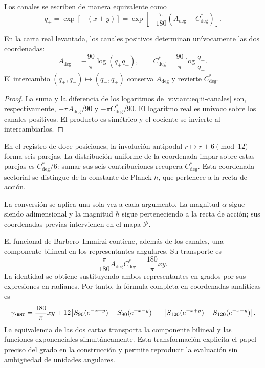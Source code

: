 Los canales se escriben de manera equivalente como
\begin{equation}
 q_\pm=\exp[-(x\pm y)]
 =\exp\!\left[-\frac{\pi}{180}(A_{\deg}\pm C^*_{\deg})\right].
\label{v:v:ant:eq:ii-canales}
\end{equation}
\begin{proposition}
\label{v:v:ant:prop:ii-inversion-canales-angulares}
En la carta real levantada, los canales positivos determinan
unívocamente las dos coordenadas:
\[
 A_{\deg}=-\frac{90}{\pi}\log(q_+q_-),\qquad
 C^*_{\deg}=\frac{90}{\pi}\log\frac{q_-}{q_+}.
\]
El intercambio \((q_+,q_-)\mapsto(q_-,q_+)\) conserva
\(A_{\deg}\) y revierte \(C^*_{\deg}\).
\end{proposition}
\begin{proof}
La suma y la diferencia de los logaritmos de
\eqref{v:v:ant:eq:ii-canales} son, respectivamente,
\(-\pi A_{\deg}/90\) y \(-\pi C^*_{\deg}/90\).
El logaritmo real es unívoco sobre los canales positivos.
El producto es simétrico y el cociente se invierte al intercambiarlos.
\end{proof}
En el registro de doce posiciones, la involución antipodal
\(r\mapsto r+6\pmod {12}\) forma seis parejas. La distribución
uniforme de la coordenada impar sobre estas parejas es
\(C^*_{\deg}/6\): sumar sus seis contribuciones recupera
\(C^*_{\deg}\). Esta coordenada sectorial se distingue de
la constante de Planck \(h\), que pertenece a la recta de acción.

La conversión se aplica una sola vez a cada argumento. La magnitud
\(\alpha\) sigue siendo adimensional y la magnitud \(\hbar\)
sigue perteneciendo a la recta de acción; sus coordenadas previas
intervienen en el mapa \(\mathcal P\).

El funcional de Barbero--Immirzi contiene, además de los canales, una
componente bilineal en los representantes angulares. Su transporte es
\begin{equation}
 \frac{\pi}{180}A_{\deg}C^*_{\deg}
 =\frac{180}{\pi}xy.
 \label{v:v:ant:eq:ii-barbero-cartas}
\end{equation}
La identidad se obtiene sustituyendo ambos representantes en grados
por sus expresiones en radianes. Por tanto, la fórmula completa en
coordenadas analíticas es
\[
 \gamma_{\HMT}
 =\frac{180}{\pi}xy
 +12\bigl[S_{90}(e^{-x+y})-S_{90}(e^{-x-y})\bigr]
 -\bigl[S_{120}(e^{-x+y})-S_{120}(e^{-x-y})\bigr].
\]
La equivalencia de las dos cartas transporta la componente bilineal
y las funciones exponenciales simultáneamente. Esta transformación
explicita el papel preciso del grado en la construcción y permite
reproducir la evaluación sin ambigüedad de unidades angulares.
